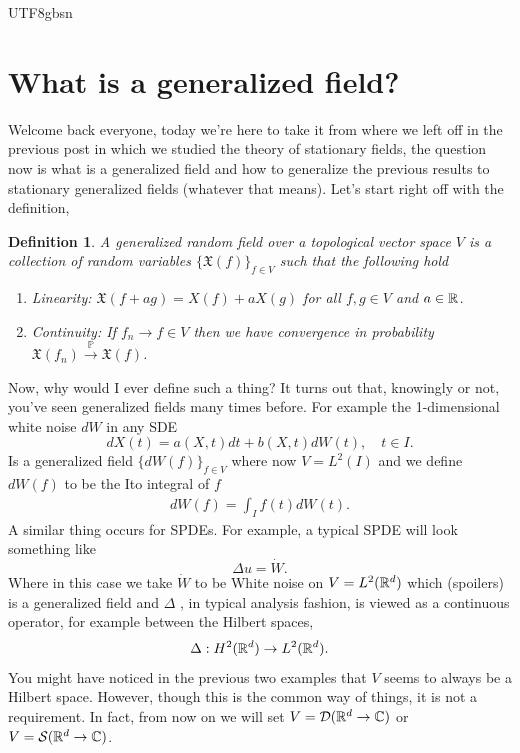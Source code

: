 \documentclass[12pt]{article}
\newtheorem{definition}{Definition}
\begin{document}
\begin{CJK*}{UTF8}{gbsn}
	\section{What is a generalized field?}
	Welcome back everyone, today we're here to take it from where we left off in the previous post in which we studied the theory of stationary fields, the question now is what is a generalized field and how to generalize the previous results to stationary generalized fields (whatever that means). Let's start right off with the definition,
	\begin{definition}\label{gen field def}
		A generalized random field over a topological vector space $V$ is a collection of random variables  $\{\mathfrak{X}(f)\}_{f\in V}$ such that the following hold
		\begin{enumerate}
			\item \emph{Linearity}: $\mathfrak{X}(f+ag)=X(f)+aX(g)$ for all  $f,g\in V$ and $a\in {\mathbb R}$.
			\item \emph{Continuity}: If $f_n\to f\in V$ then we have convergence in probability $\mathfrak{X}(f_n)\xrightarrow{\mathbb{P}}\mathfrak{X}(f)$.
		\end{enumerate}
	\end{definition}
	Now, why would I ever define such a thing? It turns out that, knowingly or not, you've seen generalized fields many times before. For example the 1-dimensional white noise  $dW$ in any SDE
	\begin{equation*}
		dX(t)=a(X,t)d t  +b(X,t)dW(t),\quad t\in I.
	\end{equation*}
	Is a generalized field $\{dW(f)\}_{f \in V}$ where now $V=L^2(I)$ and we define $dW(f)$ to be the Ito integral of  $f$
	\begin{align*}
		dW(f)= \int_{I} f(t)dW(t)
		.\end{align*}
	A similar thing occurs for SPDEs. For example, a typical SPDE will look something like
	\begin{equation*}
		\Delta u=\dot{W}.
	\end{equation*}
	Where in this case we take $\dot{W}$ to be White noise on $V=L^2({\mathbb R}^d)$  which (spoilers) is a generalized field and $\Delta $ , in typical analysis fashion, is viewed as a continuous operator, for example between  the Hilbert spaces, $$\Delta :H^2({\mathbb R}^d)\to L^2({\mathbb R}^d).$$ You might have noticed in the previous two examples that $V$ seems to always be a Hilbert space. However, though this is the common way of things, it is not a requirement. In fact, from now on we will set $V=\mathcal{D}({\mathbb R}^d\to\mathbb{C})$ or $V={\mathcal S}({\mathbb R}^d\to\mathbb{C})$.\\

\end{CJK*}
\end{document}
